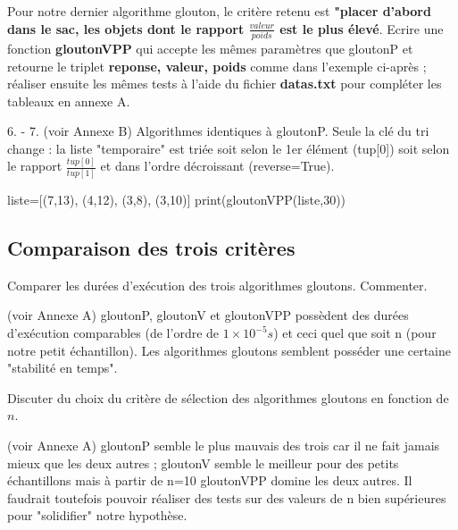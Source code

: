\documentclass[a4paper,11,answers
]{exam}
\begin{document}
\begin{questions}
Pour notre dernier algorithme glouton, le critère retenu est \textbf{"placer d'abord dans le sac, les objets dont le rapport \boldmath\( \frac{valeur}{poids} \) est le plus élevé}. Ecrire une fonction \textbf{gloutonVPP} qui accepte les mêmes paramètres que gloutonP et retourne le triplet \textbf{reponse, valeur, poids} comme dans l'exemple ci-après ; réaliser ensuite les mêmes tests à l'aide du fichier  \textbf{datas.txt} pour compléter les tableaux en annexe A.
\begin{solution} 6. - 7.
(voir Annexe B) Algorithmes identiques à gloutonP.  Seule la clé du tri change : la liste "temporaire"  est triée soit  selon le 1er élément (tup[0])  soit selon le rapport $\frac{tup[0]}{tup[1]}$ et dans l'ordre décroissant (reverse=True). 
\end{solution}
  \vspace{5mm}
\begin{tcolorbox}[enhanced,attach boxed title to top center={yshift=-3mm,yshifttext=-1mm},
  colback=green!5!white,colframe=green!75!black,colbacktitle=green!25!black,
  title=Console Python, fonttitle=\bfseries,
  boxed title style={size=small,colframe=blue!25!black} ]
\begin{pyconsole}
liste=[(7,13), (4,12), (3,8), (3,10)]
print(gloutonVPP(liste,30))
\end{pyconsole}
\end{tcolorbox}
\subsection{Comparaison des trois critères}
\question Comparer les durées d'exécution des trois algorithmes gloutons. Commenter. 
\begin{solution} 
(voir Annexe A) gloutonP, gloutonV et gloutonVPP possèdent des durées d'exécution comparables (de l'ordre de $1\times10^{-5}s$) et ceci quel que soit n (pour notre petit échantillon). Les algorithmes gloutons semblent posséder une certaine "stabilité en temps".
\end{solution} 
\question Discuter du choix du critère de sélection des algorithmes gloutons en fonction de $n$.
\begin{solution} 
(voir Annexe A) gloutonP semble le plus mauvais des trois car il ne fait jamais mieux que les deux autres ; gloutonV semble le meilleur pour des petits échantillons mais à partir de n=10 gloutonVPP domine les deux autres. Il faudrait toutefois pouvoir réaliser des tests sur des valeurs de n bien supérieures pour "solidifier" notre hypothèse.
\end{solution} 









\end{questions}
\pagebreak
\appendix
\end{document}
